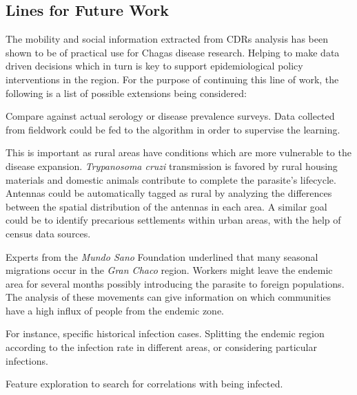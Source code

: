 \subsection{Lines for Future Work}

The mobility and social information extracted from CDRs analysis has been shown to be of practical use for Chagas disease research. Helping to make data driven decisions which in turn is key to support epidemiological policy interventions in the region. For the purpose of continuing this line of work, the following is a list of possible extensions being considered:

\begin{description}
	\item [Results validation.] Compare against actual serology or disease prevalence surveys. Data collected from fieldwork could be fed to the algorithm in order to supervise the learning. 
	
	\item [Differentiating rural antennas from urban ones.] This is important as rural areas have conditions which are more vulnerable to the disease expansion. \textit{Trypanosoma cruzi} transmission is favored by rural housing materials and domestic animals contribute to complete the parasite's lifecycle. Antennas could be automatically tagged as rural by analyzing the differences between the spatial distribution of the antennas in each area. A similar goal could be to identify precarious settlements within urban areas, with the help of census data sources.
	
	\item [Seasonal migration analysis.] Experts from the \textit{Mundo Sano} Foundation underlined that many seasonal migrations occur in the \textit{Gran Chaco} region. 
	Workers might leave the endemic area for several months possibly introducing the parasite to foreign populations.
	The analysis of these movements can give information on which communities have a high influx of people from the endemic zone.
	
	\item [Search for epidemiological data at a finer grain.] For instance, specific historical infection cases. Splitting the endemic region according to the infection rate in different areas, or considering particular infections.
	\item Feature exploration to search for correlations with being infected.
\end{description}

